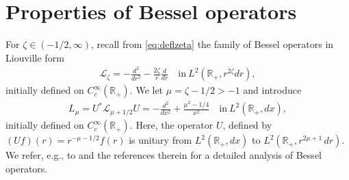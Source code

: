 \documentclass[12pt,reqno,a4paper]{amsart}
\theoremstyle{definition}
\theoremstyle{remark}
\numberwithin{equation}{section}
\newcommand{\1}{\mathbbm{1}}
\newcommand{\R}{\mathbb{R}}
\def\cl{\mathcal{L}}
\begin{document}
\appendix

\iffalse
\section{Properties of Bessel operators}


\label{ss:besseldomain}

For $\zeta\in(-1/2,\infty)$, recall from \eqref{eq:deflzeta} the family of Bessel operators in Liouville form
\begin{align}
  \cl_\zeta = -\frac{d^2}{dr^2} - \frac{2\zeta}{r}\frac{d}{dr}
  \quad \text{in} \ L^2(\R_+,r^{2\zeta}dr),
\end{align}
initially defined on $C_c^\infty(\R_+)$. We let $\mu=\zeta-1/2>-1$ and introduce
\begin{align}
  \label{eq:deflmu}
  L_{\mu}
  = U^*\cl_{\mu+1/2}U
  = -\frac{d^2}{dx^2} + \frac{\mu^2-1/4}{x^2}
  \quad \text{in}\ L^2(\R_+,dx),
\end{align}
initially defined on $C_c^\infty(\R_+)$. Here, the operator $U$, defined by $(Uf)(r)=r^{-\mu-1/2}f(r)$ is unitary from $L^2(\R_+,dx)$ to $L^2(\R_+,r^{2\mu+1}\,dr)$.
We refer, e.g., to \cite{EverittKalf2007,Bruneauetal2011,DerezinskiRichard2017,DerezinskiFaupin2020} and the references therein for a detailed analysis of Bessel operators.
\end{document}
